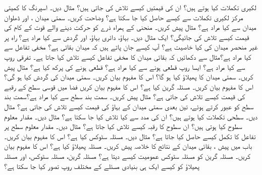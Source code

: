 لکیری تکملات کیا ہوتے ہیں؟ ان کی قیمتیں کیسے تلاش کی جاتی ہیں؟ مثال دیں۔
اسپرنگ کا کمیتی مرکز لکیری تکملات سے کیسے حاصل کیا جا سکتا ہے؟  وضاحت کریں۔
سمتی میدان ، اور  ڈھلوان میدان  سے کیا مراد ہے؟ مثال پیش کریں۔
منحنی کے ہمراہ   ذرے کو حرکت دینے والے قوت کے کام کی قیمت کیسے تلاش کی جائیگی؟ ایک مثال دیں۔
بہاؤ، دائری بہاؤ، اور گردش سے کیا مراد ہے؟
راہ پر غیر منحصر میدان کی کیا خاصیت ہے؟
آپ کیسے جان پاتے ہیں کہ  میدان بقائی ہے؟
مخفی تفاعل سے کیا مراد ہے؟مثال سے دکھائیں  کہ بقائی میدان کا مخفی تفاعل کیسے تلاش کیا جاتا ہے۔
تفرقی روپ سے کیا مراد ہے؟ ایسا  روپ  قطعی ہونے سے کیا مراد ہے؟ قطعی ہونے کی پرکھ کیا ہے؟ مثال پیش کریں۔
سمتی میدان کا   پھیلاؤ کیا ہو گا؟ اس کا  مفہوم بیان کریں۔
سمتی میدان کی گردش کیا ہو گی؟اس کا مفہوم بیان کریں۔
مسئلہ گرین کیا ہے؟ اس کا مفہوم بیان کریں
فضا میں  قوسی سطح کے رقبے کی قیمت کیسے تلاش کی جاتی ہے؟ مثال پیش کریں۔
سمت بند سطح سے کیا مراد ہے؟سمت بند سطح کو عبور کرتے ہوئے،  تین بعدی سمتی میدان کے بہاؤ کی قیمت  کیسے  تلاش  کی جاتی ہے؟ مثال دیں۔
سطحی تکملات کیا ہوتے ہیں؟ ان کی مدد سے کیا تلاش کیا جا سکتا ہے؟ مثال دیں۔
مقدار معلوم سطوح کیا ہوتی ہیں؟ ان سطوح کا رقبہ کیسے تلاش کیا جاتا ہے؟ مثال دیں۔
مقدار معلوم سطح پر تفاعل کا تکمل کیسے حاصل کیا جاتا ہے؟ مثال دیں۔
مسئلہ سٹوکس کیا ہے؟ اس  کا مفہوم بیان کریں۔
 باب میں پیش ، بقائی میدان کے  نتائج  کا خلاصہ پیش کریں۔
مسئلہ پھیلاؤ کیا ہے؟ اس کا مفہوم بیان کریں۔
مسئلہ گرین کو مسئلہ سٹوکس عمومیت کیسے دیتا ہے؟
مسئلہ گرین، مسئلہ سٹوکس، اور مسئلہ پھیلاؤ کو کیسے ایک ہی بنیادی مسئلے کے مختلف روپ تصور کیا جا سکتا ہے؟


